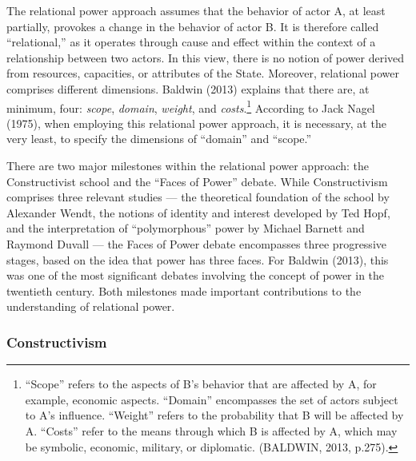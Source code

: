 The relational power approach assumes that the behavior of actor A, at least partially, provokes a change in the behavior of actor B. It is therefore called ``relational,'' as it operates through cause and effect within the context of a relationship between two actors. In this view, there is no notion of power derived from resources, capacities, or attributes of the State. Moreover, relational power comprises different dimensions. Baldwin (2013) explains that there are, at minimum, four: \textit{scope}, \textit{domain}, \textit{weight}, and \textit{costs}.\footnote{``Scope'' refers to the aspects of B's behavior that are affected by A, for example, economic aspects. ``Domain'' encompasses the set of actors subject to A's influence. ``Weight'' refers to the probability that B will be affected by A. ``Costs'' refer to the means through which B is affected by A, which may be symbolic, economic, military, or diplomatic. (BALDWIN, 2013, p.275).} According to Jack Nagel (1975), when employing this relational power approach, it is necessary, at the very least, to specify the dimensions of ``domain'' and ``scope.''

There are two major milestones within the relational power approach: the Constructivist school and the ``Faces of Power'' debate. While Constructivism comprises three relevant studies --- the theoretical foundation of the school by Alexander Wendt, the notions of identity and interest developed by Ted Hopf, and the interpretation of ``polymorphous'' power by Michael Barnett and Raymond Duvall --- the Faces of Power debate encompasses three progressive stages, based on the idea that power has three faces. For Baldwin (2013), this was one of the most significant debates involving the concept of power in the twentieth century. Both milestones made important contributions to the understanding of relational power.

\subsubsection{Constructivism}

